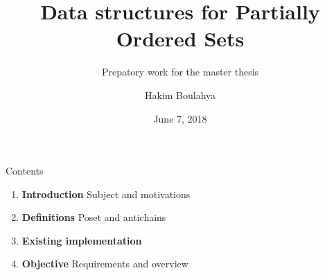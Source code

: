 \documentclass[11pt]{beamer}
\title{Data structures for Partially Ordered Sets}  %
\subtitle{Prepatory work for the master thesis}
\date{June 7, 2018}
\author{
  Hakim Boulahya
}
\institute[
  Faculty of Science
  Université Libre de Bruxelles
  Belgium
] %
{%
  Département d'Informatique \\
  Université Libre de Bruxelles \\
  Belgium

}
\begin{document}
{\aauwavesbg%
\begin{frame} %
  \titlepage
\end{frame}}

\begin{frame}{Contents}{}

\begin{block}{}
  \begin{enumerate}
    \item \textcolor{firstcolor}{\textbf{Introduction}}
     Subject and motivations
    \item \textcolor{firstcolor}{\textbf{Definitions}}
     Poset and antichains
     \item \textcolor{firstcolor}{\textbf{Existing implementation}}
    \item \textcolor{firstcolor}{\textbf{Objective}}
     Requirements and overview
  \end{enumerate}
\end{block}

\end{frame}

\end{document}
